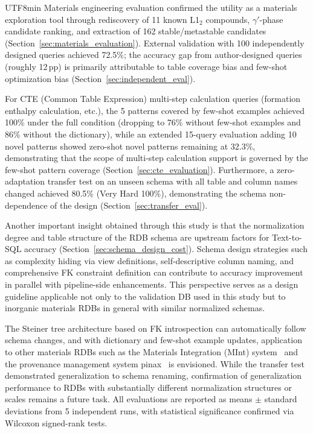\documentclass[sn-mathphys,Numbered]{sn-jnl}
\begin{document}
\begin{CJK}{UTF8}{min}
Materials engineering evaluation confirmed the utility as a
materials exploration tool through rediscovery of 11 known L1$_2$
compounds, $\gamma'$-phase candidate ranking, and extraction of
162 stable/metastable candidates
(Section~\ref{sec:materials_evaluation}).
External validation with 100 independently designed queries
achieved 72.5\%; the accuracy gap from author-designed queries
(roughly 12\,pp) is primarily attributable to table coverage bias
and few-shot optimization bias
(Section~\ref{sec:independent_eval}).

For CTE (Common Table Expression) multi-step calculation queries
(formation enthalpy calculation, etc.), the 5 patterns covered by
few-shot examples achieved 100\% under the full condition
(dropping to 76\% without few-shot examples and 86\% without the
dictionary), while an extended 15-query evaluation adding 10 novel
patterns showed zero-shot novel patterns remaining at 32.3\%,
demonstrating that the scope of multi-step calculation support is
governed by the few-shot pattern coverage
(Section~\ref{sec:cte_evaluation}).
Furthermore, a zero-adaptation transfer test on an unseen schema
with all table and column names changed achieved 80.5\%
(Very Hard 100\%), demonstrating the schema non-dependence of the
design (Section~\ref{sec:transfer_eval}).

Another important insight obtained through this study is that the
normalization degree and table structure of the RDB schema are
upstream factors for Text-to-SQL accuracy
(Section~\ref{sec:schema_design_cost}).
Schema design strategies such as complexity hiding via view
definitions, self-descriptive column naming, and comprehensive FK
constraint definition can contribute to accuracy improvement in
parallel with pipeline-side enhancements.
This perspective serves as a design guideline applicable not only
to the validation DB used in this study but to inorganic materials
RDBs in general with similar normalized schemas.

The Steiner tree architecture based on FK introspection can
automatically follow schema changes, and with dictionary and
few-shot example updates, application to other materials RDBs
such as the Materials Integration (MInt) system~\cite{minamoto2020mint}
and the provenance management system
pinax~\cite{minamoto2026pinax} is envisioned.
While the transfer test demonstrated generalization to schema
renaming, confirmation of generalization performance to RDBs with
substantially different normalization structures or scales remains
a future task.
All evaluations are reported as means $\pm$ standard deviations
from 5 independent runs, with statistical significance confirmed
via Wilcoxon signed-rank tests.


\end{CJK}
\end{document}
